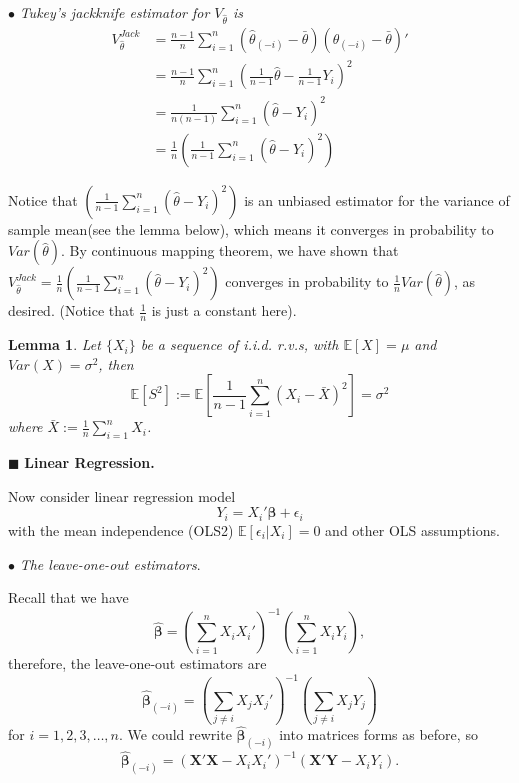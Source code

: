 \documentclass[11pt,a4paper]{amsart}
\theoremstyle{plain}
\newtheorem{lemma}{Lemma}
\theoremstyle{definition}
\begin{document}
	$\bullet$ \emph{Tukey’s jackknife estimator for $V_{\hat{\theta}}$ is}
	\[	\begin{aligned}
		V^{Jack}_{\hat{\theta}} &= \frac{n-1}{n}\sum_{i=1}^{n} \left(\hat{\theta}_{(-i)} - \bar{\theta}\right) \left(\hat{\theta}_{(-i)} - \bar{\theta}\right)'  \\
		&= \frac{n-1}{n}\sum_{i=1}^{n} \left(\frac{1}{n-1}\hat{\theta} - \frac{1}{n-1}Y_{i}\right)^{2} \\
		&= \frac{1}{n(n-1)} \sum_{i=1}^{n} \left(\hat{\theta} - Y_{i}\right)^{2} \\
		&= \frac{1}{n}\left( \frac{1}{n-1} \sum_{i=1}^{n} \left(\hat{\theta} - Y_{i}\right)^{2} \right)
	\end{aligned}	\]
	
	Notice that $\left( \frac{1}{n-1} \sum_{i=1}^{n} \left(\hat{\theta} - Y_{i}\right)^{2} \right)$ is an unbiased estimator for the variance of sample mean(see the lemma below), which means it converges in probability to $Var(\hat{\theta})$. By continuous mapping theorem, we have shown that $V^{Jack}_{\hat{\theta}} = \frac{1}{n}\left( \frac{1}{n-1} \sum_{i=1}^{n} \left(\hat{\theta} - Y_{i}\right)^{2} \right)$ converges in probability to $\frac{1}{n} Var(\hat{\theta})$, as desired. (Notice that $\frac{1}{n}$ is just a constant here).
	\begin{framed}
		\begin{lemma}
			Let $\{X_{i}\}$ be a sequence of i.i.d. r.v.s, with $\mathbb{E}[X] = \mu$ and $Var(X)=\sigma^{2}$, then
			\[	\mathbb{E}[S^{2}] := \mathbb{E}[\frac{1}{n-1}\sum_{i=1}^{n} \left(X_{i} - \bar{X}\right)^{2}] = \sigma^{2}	\]
			where $\bar{X} := \frac{1}{n}\sum_{i=1}^{n}X_{i}$.
		\end{lemma}
	\end{framed}

	\vspace{10pt}
	
		$\blacksquare$ \textbf{Linear Regression.}\par 
	Now consider linear regression model 
	\[	Y_{i} = X_{i}' \bm{\beta} + \epsilon_{i}	\]
	with the mean independence (OLS2) $\mathbb{E}[\epsilon_{i}|X_{i}] = 0$ and other OLS assumptions.\par 
	$\bullet$ \emph{The leave-one-out estimators}.\par 
	Recall that we have 
	\[	\hat{\bm{\beta}} = \left(\sum_{i=1}^{n}X_{i}X_{i}'\right)^{-1}\left(\sum_{i=1}^{n}X_{i}Y_{i}\right),	\]
	therefore, the  leave-one-out estimators are 
	\[		\hat{\bm{\beta}}_{(-i)} = \left(\sum_{j\ne i} X_{j}X_{j}'\right)^{-1}\left(\sum_{j\ne i} X_{j}Y_{j}\right)	\]
	for $i = 1,2,3, \dots, n$.
	We could rewrite $	\hat{\bm{\beta}}_{(-i)} $ into matrices forms as before, so
	\[		\hat{\bm{\beta}}_{(-i)}  = \left(\bm{X}'\bm{X} - X_{i}X_{i}'\right)^{-1}\left(\bm{X}'\bm{Y}- X_{i}Y_{i}\right).	\]
	
\end{document}
